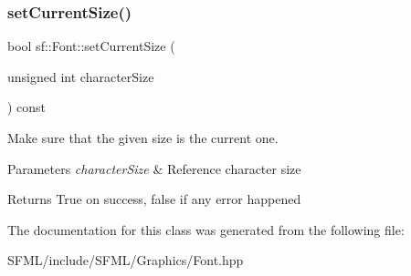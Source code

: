 \subsubsection{\texorpdfstring{setCurrentSize()}{setCurrentSize()}}
{\footnotesize\ttfamily bool sf\+::\+Font\+::set\+Current\+Size (\begin{DoxyParamCaption}\item[{unsigned int}]{character\+Size }\end{DoxyParamCaption}) const\hspace{0.3cm}{\ttfamily [private]}}



Make sure that the given size is the current one. 


\begin{DoxyParams}{Parameters}
{\em character\+Size} & Reference character size\\
\hline
\end{DoxyParams}
\begin{DoxyReturn}{Returns}
True on success, false if any error happened \begin{DoxyVerb}\end{DoxyVerb}
 
\end{DoxyReturn}


The documentation for this class was generated from the following file\+:\begin{DoxyCompactItemize}
\item 
S\+F\+M\+L/include/\+S\+F\+M\+L/\+Graphics/Font.\+hpp\end{DoxyCompactItemize}
